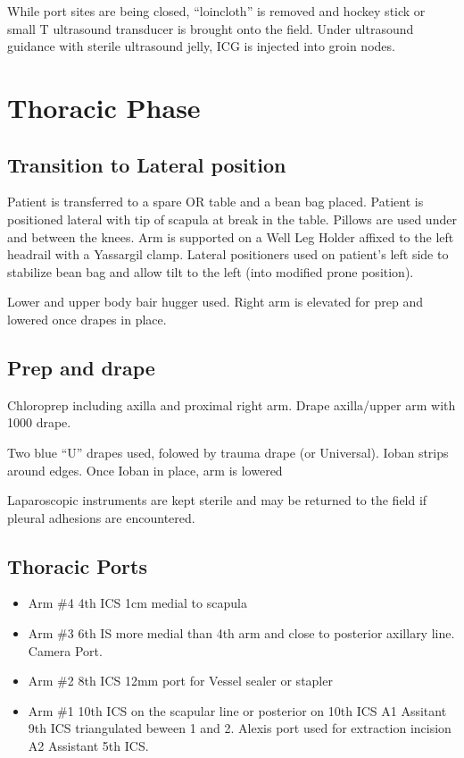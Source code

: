 \documentclass[
  letterpaper,
]{scrbook}
\providecommand{\tightlist}{%
  \setlength{\itemsep}{0pt}\setlength{\parskip}{0pt}}
\begin{document}
While port sites are being closed, ``loincloth'' is removed and hockey
stick or small T ultrasound transducer is brought onto the field. Under
ultrasound guidance with sterile ultrasound jelly, ICG is injected into
groin nodes.

\chapter{Thoracic Phase}\label{thoracic-phase}

\section{Transition to Lateral
position}\label{transition-to-lateral-position}

Patient is transferred to a spare OR table and a bean bag placed.
Patient is positioned lateral with tip of scapula at break in the table.
Pillows are used under and between the knees. Arm is supported on a Well
Leg Holder affixed to the left headrail with a Yassargil clamp. Lateral
positioners used on patient's left side to stabilize bean bag and allow
tilt to the left (into modified prone position).

Lower and upper body bair hugger used. Right arm is elevated for prep
and lowered once drapes in place.

\section{Prep and drape}\label{prep-and-drape}

Chloroprep including axilla and proximal right arm. Drape axilla/upper
arm with 1000 drape.

Two blue ``U'' drapes used, folowed by trauma drape (or Universal).
Ioban strips around edges. Once Ioban in place, arm is lowered

Laparoscopic instruments are kept sterile and may be returned to the
field if pleural adhesions are encountered.

\section{Thoracic Ports}\label{thoracic-ports}

\begin{itemize}
\tightlist
\item
  Arm \#4 4th ICS 1cm medial to scapula
\item
  Arm \#3 6th IS more medial than 4th arm and close to posterior
  axillary line. Camera Port.
\item
  Arm \#2 8th ICS 12mm port for Vessel sealer or stapler
\item
  Arm \#1 10th ICS on the scapular line or posterior on 10th ICS A1
  Assitant 9th ICS triangulated beween 1 and 2. Alexis port used for
  extraction incision A2 Assistant 5th ICS.
\end{itemize}
\end{document}
